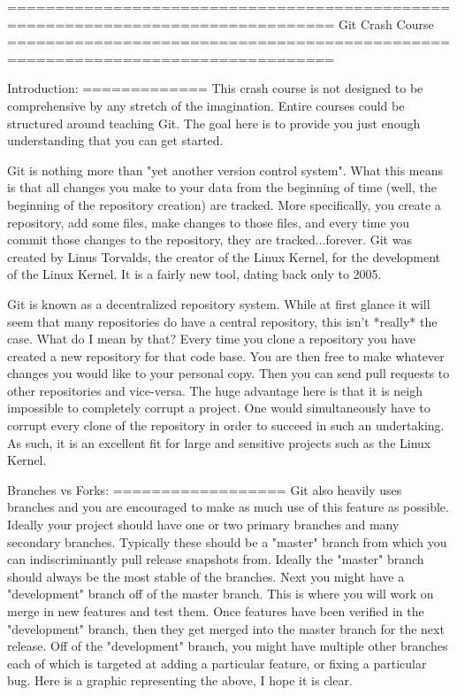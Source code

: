 ================================================================================
Git Crash Course
================================================================================

Introduction:
=============
This crash course is not designed to be comprehensive by any stretch of the imagination.  Entire courses could be structured around teaching Git.  The goal here is to provide you just enough understanding that you can get started.

Git is nothing more than "yet another version control system".  What this means is that all changes you make to your data from the beginning of time (well, the beginning of the repository creation) are tracked.  More specifically, you create a repository, add some files, make changes to those files, and every time you commit those changes to the repository, they are tracked...forever.  Git was created by Linus Torvalds, the creator of the Linux Kernel, for the development of the Linux Kernel.  It is a fairly new tool, dating back only to 2005.  

Git is known as a decentralized repository system.  While at first glance it will seem that many repositories do have a central repository, this isn't *really* the case.  What do I mean by that?  Every time you clone a repository you have created a new repository for that code base.  You are then free to make whatever changes you would like to your personal copy.  Then you can send pull requests to other repositories and vice-versa.  The huge advantage here is that it is neigh impossible to completely corrupt a project.  One would simultaneously have to corrupt every clone of the repository in order to succeed in such an undertaking.  As such, it is an excellent fit for large and sensitive projects such as the Linux Kernel.  



Branches vs Forks:
==================
Git also heavily uses branches and you are encouraged to make as much use of this feature as possible.  Ideally your project should have one or two primary branches and many secondary branches.  Typically these should be a "master" branch from which you can indiscriminantly pull release snapshots from.  Ideally the "master" branch should always be the most stable of the branches.  Next you might have a "development" branch off of the master branch.  This is where you will work on merge in new features and test them.  Once features have been verified in the "development" branch, then they get merged into the master branch for the next release.  Off of the "development" branch, you might have multiple other branches each of which is targeted at adding a particular feature, or fixing a particular bug.  Here is a graphic representing the above, I hope it is clear.

